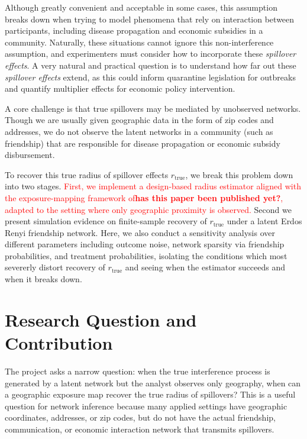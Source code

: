 \documentclass[11pt]{article}
\begin{document}
Although greatly convenient and acceptable in some cases, this assumption breaks down when trying to model phenomena that rely on interaction between participants, including disease propagation and economic subsidies in a community. Naturally, these situations cannot ignore this non-interference assumption, and experimenters must consider how to incorporate these \emph{spillover effects}. A very natural and practical question is to understand how far out these \emph{spillover effects} extend, as this could inform quarantine legislation for outbreaks and quantify multiplier effects for economic policy intervention. 

A core challenge is that true spillovers may be mediated by unobserved networks. Though we are usually given geographic data in the form of zip codes and addresses, we do not observe the latent  networks in a community (such as friendship) that are responsible for disease propagation or economic subsidy disbursement. 

To recover this true radius of spillover effects $r_{\text{true}}$, we break this problem down into two stages.
\textcolor{red}{First, we implement a design-based radius estimator aligned with the exposure-mapping framework
of\textbf{has this paper been published yet?}, adapted to the setting where only geographic proximity is observed.} Second we present simulation evidence on finite-sample recovery of $r_{\text{true}}$ under a latent Erdos Renyi friendship network. Here, we also conduct a sensitivity analysis over different parameters including outcome noise, network sparsity via friendship probabilities, and treatment probabilities, isolating the conditions which most severerly distort recovery of $r_{\text{true}}$ and seeing when the estimator succeeds and when it breaks down. 

\section{Research Question and Contribution}

The project asks a narrow question: when the true interference process is generated by a latent network but the analyst observes only geography, when can a geographic exposure map recover the true radius of spillovers? This is a useful question for network inference because many applied settings have geographic coordinates, addresses, or zip codes, but do not have the actual friendship, communication, or economic interaction network that transmits spillovers.
\end{document}
